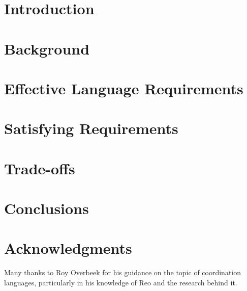 \documentclass[letterpaper,twocolumn,10pt]{article}
\begin{document}

\section{Introduction}
\label{intro}


\section{Background}
\label{related}


\section{Effective Language Requirements}
\label{feature}


\section{Satisfying Requirements}
\label{how}


\section{Trade-offs}
\label{tradeoff}


\section{Conclusions}
\label{conclusion}


\section{Acknowledgments}
Many thanks to Roy Overbeek for his guidance on the topic of coordination languages, particularly in his knowledge of Reo and the research behind it.

\noindent

{\footnotesize 
}

\end{document}
